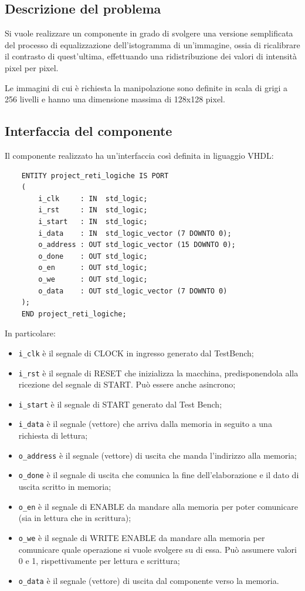 \documentclass{article}
\begin{document}
\subsection{Descrizione del problema} %
Si vuole realizzare un componente in grado di svolgere una versione semplificata del processo di equalizzazione dell’istogramma di un’immagine, ossia di ricalibrare il contrasto di quest’ultima,
effettuando una ridistribuzione dei valori di intensità pixel per pixel. \par
Le immagini di cui è richiesta la manipolazione sono definite in scala di grigi a 256 livelli e hanno una dimensione massima di 128x128 pixel.
\vspace{0,3cm} %

\subsection{Interfaccia del componente} %
Il componente realizzato ha un’interfaccia così definita in liguaggio VHDL:

\begin{verbatim}
    ENTITY project_reti_logiche IS PORT
	(
		i_clk     : IN  std_logic;
		i_rst     : IN  std_logic; 
		i_start   : IN  std_logic; 
		i_data    : IN  std_logic_vector (7 DOWNTO 0);
		o_address : OUT std_logic_vector (15 DOWNTO 0);
		o_done    : OUT std_logic; 
		o_en      : OUT std_logic;
		o_we      : OUT std_logic;
		o_data    : OUT std_logic_vector (7 DOWNTO 0) 
	);
    END project_reti_logiche;
\end{verbatim}
\vspace{0,3cm} %

In particolare:
\begin{itemize}
    \item   \texttt{i\_clk} è il segnale di CLOCK in ingresso generato dal TestBench;
    \item   \texttt{i\_rst} è il segnale di RESET che inizializza la macchina, predisponendola alla ricezione del segnale di START. Può essere anche asincrono;
    \item   \texttt{i\_start} è il segnale di START generato dal Test Bench;
    \item   \texttt{i\_data} è il segnale (vettore) che arriva dalla memoria in seguito a una richiesta di lettura;
    \item   \texttt{o\_address} è il segnale (vettore) di uscita che manda l’indirizzo alla memoria;
    \item   \texttt{o\_done} è il segnale di uscita che comunica la fine dell’elaborazione e il dato di uscita scritto in memoria;
    \item   \texttt{o\_en} è il segnale di ENABLE da mandare alla memoria per poter comunicare (sia in lettura che in scrittura);
    \item   \texttt{o\_we} è il segnale di WRITE ENABLE da mandare alla memoria per comunicare quale operazione si vuole svolgere su di essa. Può assumere valori 0 e 1, rispettivamente per lettura e scrittura;
    \item   \texttt{o\_data} è il segnale (vettore) di uscita dal componente verso la memoria.
\end{itemize}
\end{document}
